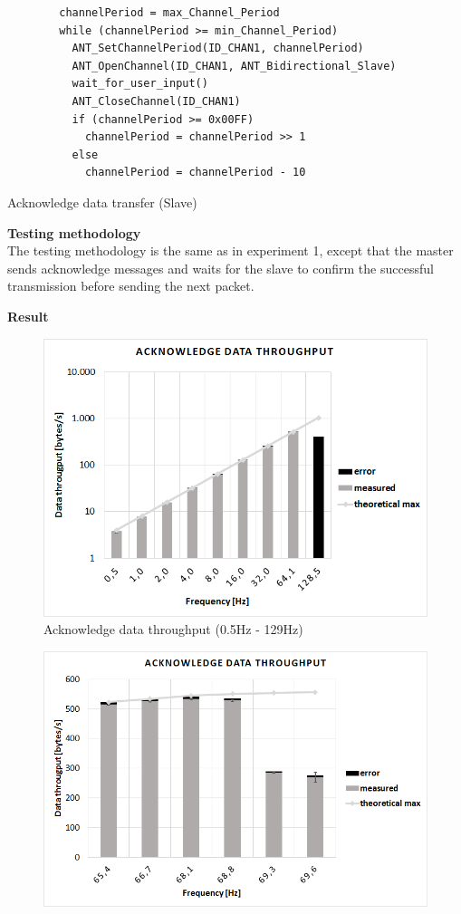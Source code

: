 \begin{description}
	\begin{code}[H]
		\begin{verbatim}
		channelPeriod = max_Channel_Period
		while (channelPeriod >= min_Channel_Period) 
		  ANT_SetChannelPeriod(ID_CHAN1, channelPeriod)
		  ANT_OpenChannel(ID_CHAN1, ANT_Bidirectional_Slave)
		  wait_for_user_input()
		  ANT_CloseChannel(ID_CHAN1)
		  if (channelPeriod >= 0x00FF)
		    channelPeriod = channelPeriod >> 1
		  else
		    channelPeriod = channelPeriod - 10
		\end{verbatim}
		\caption{Acknowledge data transfer (Slave)}\label{lst:sExp3}
	\end{code}
	\item{\textbf{Testing methodology}} \hfill \\ The testing methodology is the same as in experiment 1, except that the master sends acknowledge messages and waits for the slave to confirm the successful transmission before sending the next packet. 
	\newpage
	\item{\textbf{Result}} \hfill \\
	\begin{figure}[H]
		\centering
		\includegraphics[scale=0.5]{content/images/exp3_norm.png}
		\caption{Acknowledge data throughput (0.5Hz - 129Hz)}\label{fig:exp4norm}
	\end{figure}
	\begin{figure}[H]
		\centering
		\includegraphics[scale=0.5]{content/images/exp3_detail.png}

\end{figure}
\end{description}
